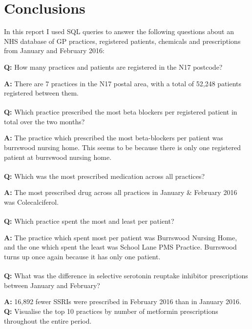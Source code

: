 \documentclass{report}
\begin{document}
\chapter{Conclusions}
In this report I used SQL queries to answer the following questions about an NHS database of GP practices, registered patients, chemicals and prescriptions from January and February 2016:
\begin{center}
    \textbf{Q:} How many practices and patients are registered in the N17 postcode?
    
    \textbf{A:} There are 7 practices in the N17 postal area, with a total of  52,248 patients registered between them.
    \\~\\
    \textbf{Q:} Which practice prescribed the most beta blockers per registered patient in total over the two months?
    
    \textbf{A:} The practice which prescribed the most beta-blockers per patient was burrswood nursing home. This seems to be because there is only one registered patient at burrswood nursing home.
    \\~\\
    \textbf{Q:} Which was the most prescribed medication across all practices?
    
    \textbf{A:} The most prescribed drug across all practices in January \& February 2016 was Colecalciferol.
    \\~\\
    \textbf{Q:} Which practice spent the most and least per patient? 
    
    \textbf{A:} The practice which spent most per patient was Burrswood Nursing Home, and the one which spent the least was School Lane PMS Practice. Burrswood turns up once again because it has only one patient.
    \\~\\
    \textbf{Q:} What was the difference in selective serotonin reuptake inhibitor prescriptions between January and February?
    
    \textbf{A:} 16,892 fewer SSRIs were prescribed in February 2016 than in January 2016.
    \clearpage
    \textbf{Q:} Visualise the top 10 practices by number of metformin prescriptions throughout the entire period.
    

\end{center}
\end{document}

